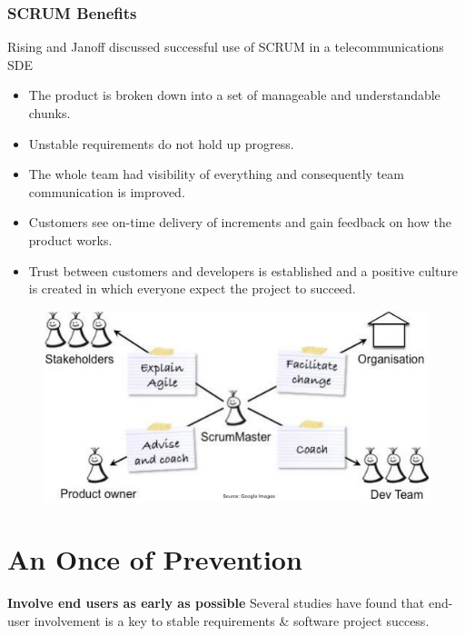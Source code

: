 \documentclass{report}
\begin{document}
\subsection{SCRUM Benefits}
\begin{multicols}{2}
\noindent Rising and Janoff discussed successful use of SCRUM in a telecommunications SDE
\begin{itemize}
  \item The product is broken down into a set of manageable and understandable chunks.
  \item Unstable requirements do not hold up progress.
  \item The whole team had visibility of everything and consequently team communication is improved.
  \item Customers see on-time delivery of increments and gain feedback on how the product works.
  \item Trust between customers and developers is established and a positive culture is created in which everyone expect the project to succeed.
\end{itemize}
\vfill\columnbreak
\begin{figure}[H]
\centering
\includegraphics[scale=.4,trim=1cm 1cm 1cm 1cm]{assets/CEN4010_Scrum_Cycle.jpg}
\end{figure}
\end{multicols}



\renewcommand\thechapter{A1}
\chapter{An Once of Prevention}
\noindent\textbf{Involve end users as early as possible}\newline
Several studies have found that end-user involvement is a key to stable requirements \& software project success.\newline
\end{document}
